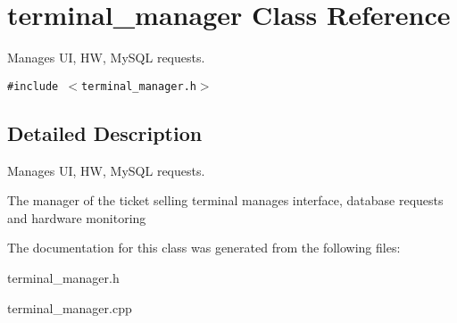 \hypertarget{classterminal__manager}{
\section{terminal\_\-manager Class Reference}
\label{classterminal__manager}
}
Manages UI, HW, MySQL requests.  


{\tt \#include $<$terminal\_\-manager.h$>$}



\subsection{Detailed Description}
Manages UI, HW, MySQL requests. 

The manager of the ticket selling terminal manages interface, database requests and hardware monitoring 

The documentation for this class was generated from the following files:\begin{CompactItemize}
\item 
terminal\_\-manager.h\item 
terminal\_\-manager.cpp\end{CompactItemize}
